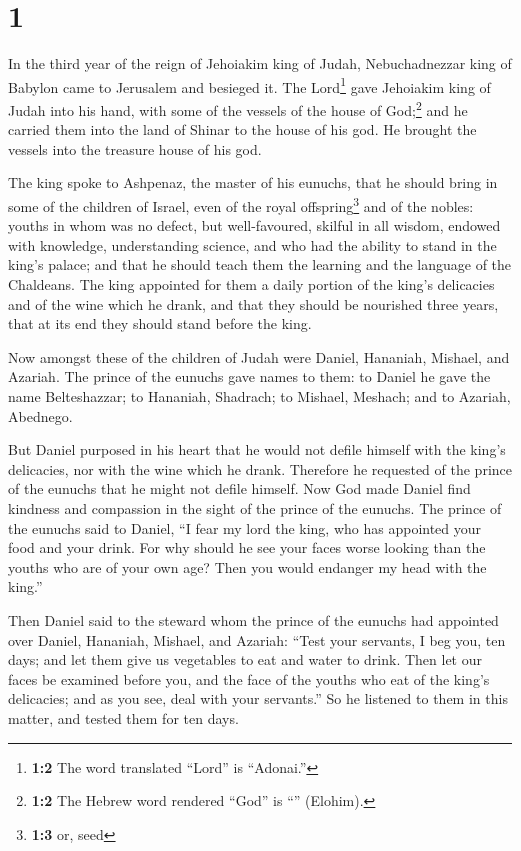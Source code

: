 \hypertarget{section}{%
\section{1}\label{section}}

 In the third year of the reign of Jehoiakim king of
Judah, Nebuchadnezzar king of Babylon came to Jerusalem and besieged it.
 The Lord\footnote{\textbf{1:2} The word translated
  ``Lord'' is ``Adonai.''} gave Jehoiakim king of Judah into his hand,
with some of the vessels of the house of God;\footnote{\textbf{1:2} The
  Hebrew word rendered ``God'' is ``'' (Elohim).} and he
carried them into the land of Shinar to the house of his god. He brought
the vessels into the treasure house of his god.

 The king spoke to Ashpenaz, the master of his eunuchs,
that he should bring in some of the children of Israel, even of the
royal offspring\footnote{\textbf{1:3} or, seed} and of the nobles:
 youths in whom was no defect, but well-favoured, skilful
in all wisdom, endowed with knowledge, understanding science, and who
had the ability to stand in the king's palace; and that he should teach
them the learning and the language of the Chaldeans.  The
king appointed for them a daily portion of the king's delicacies and of
the wine which he drank, and that they should be nourished three years,
that at its end they should stand before the king.

 Now amongst these of the children of Judah were Daniel,
Hananiah, Mishael, and Azariah.  The prince of the eunuchs
gave names to them: to Daniel he gave the name Belteshazzar; to
Hananiah, Shadrach; to Mishael, Meshach; and to Azariah, Abednego.

 But Daniel purposed in his heart that he would not defile
himself with the king's delicacies, nor with the wine which he drank.
Therefore he requested of the prince of the eunuchs that he might not
defile himself.  Now God made Daniel find kindness and
compassion in the sight of the prince of the eunuchs. 
The prince of the eunuchs said to Daniel, ``I fear my lord the king, who
has appointed your food and your drink. For why should he see your faces
worse looking than the youths who are of your own age? Then you would
endanger my head with the king.''

 Then Daniel said to the steward whom the prince of the
eunuchs had appointed over Daniel, Hananiah, Mishael, and Azariah:
 ``Test your servants, I beg you, ten days; and let them
give us vegetables to eat and water to drink.  Then let
our faces be examined before you, and the face of the youths who eat of
the king's delicacies; and as you see, deal with your servants.''
 So he listened to them in this matter, and tested them
for ten days.

